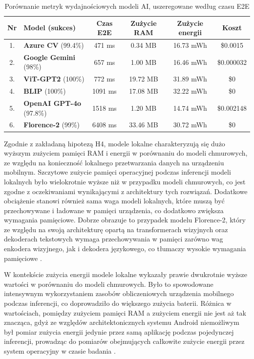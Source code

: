 \begin{table}[!h] \centering
\caption{Porównanie metryk wydajnościowych modeli AI, uszeregowane według czasu E2E}
\begin{tabular}{|c|l|c|c|c|c|} \hline
\label{tab:ranking_czas}
\textbf{Nr} & \textbf{Model (sukces)} & \textbf{Czas E2E} & \textbf{Zużycie RAM} & \textbf{Zużycie energii} & \textbf{Koszt} \\ \hline\hline
1. & \textbf{Azure CV} (99.4\%)     & 471 ms  & 0.34 MB  & 16.73 mWh & \$0.0015  \\ \hline
2. & \textbf{Google Gemini} (98\%)    & 657 ms  & 1.00 MB  & 16.46 mWh & \$0.000032    \\ \hline
3. & \textbf{ViT-GPT2} (100\%)      & 772 ms  & 19.72 MB & 31.89 mWh & \$0   \\ \hline
4. & \textbf{BLIP} (100\%)          & 1091 ms & 17.08 MB & 32.22 mWh & \$0   \\ \hline
5. & \textbf{OpenAI GPT-4o} (97.8\%)  & 1518 ms & 1.20 MB  & 14.74 mWh & \$0.002148    \\ \hline
6. & \textbf{Florence-2} (99\%)   & 6408 ms & 33.46 MB & 30.72 mWh & \$0    \\ \hline
\end{tabular}
\end{table}

Zgodnie z zakładaną hipotezą H4, modele lokalne charakteryzują się dużo wyższym zużyciem pamięci RAM i energii w porównaniu do modeli chmurowych,
ze względu na konieczność lokalnego przetwarzania danych na urządzeniu mobilnym. 
Szczytowe zużycie pamięci operacyjnej podczas inferencji modeli lokalnych było wielokrotnie wyższe niż w przypadku modeli chmurowych, co jest zgodne z oczekiwaniami wynikającymi z architektury tych rozwiązań.
Dodatkowe obciążenie stanowi również sama waga modeli lokalnych, które muszą być przechowywane i ładowane w pamięci urządzenia, co dodatkowo zwiększa wymagania pamięciowe. Dobrze obrazuje to przypadek modelu Florence-2,
który ze względu na swoją architekturę opartą na transformerach wizyjnych oraz dekoderach tekstowych wymaga przechowywania w pamięci zarówno wag enkodera wizyjnego, jak i dekodera językowego, co tłumaczy wysokie wymagania pamięciowe \cite{transformer_vaswani2017}.

W kontekście zużycia energii modele lokalne wykazały prawie dwukrotnie wyższe wartości w porównaniu do modeli chmurowych. Było to spowodowane intensywnym wykorzystaniem zasobów obliczeniowych urządzenia mobilnego podczas inferencji,
co doprowadziło do większego zużycia baterii. Różnica w wartościach, pomiędzy zużyciem pamięci RAM a zużyciem energii nie jest aż tak znacząca, gdyż ze względów architektonicznych systemu Android niemożliwym był pomiar zużycia energii jedynie przez samą aplikację podczas pojedynczej inferencji,
prowadząc do pomiarów obejmujących całkowite zużycie energii przez system operacyjny w czasie badania \cite{android_power_profiling}.

